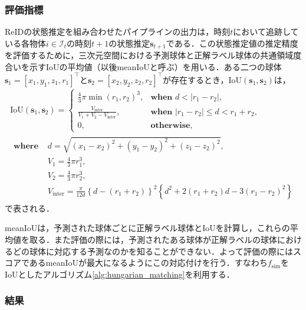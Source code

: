 \subsubsection{評価指標}

ReIDの状態推定を組み合わせたパイプラインの出力は，時刻$t$において追跡している各物体$i \in \mathcal{I}_t$の時刻$t+1$の状態推定$\bm{s}_{t+1}$である．この状態推定値の推定精度を評価するために，三次元空間における予測球体と正解ラベル球体の共通領域度合いを示すIoUの平均値（以後meanIoUと呼ぶ）を用いる．ある二つの球体$\bm{s}_1 = [x_1, y_1, z_1, r_1]^{\top}$と$\bm{s}_2 = [x_2, y_2, z_2, r_2]^{\top}$が存在するとき，IoU$(\bm{s}_1, \bm{s}_2)$は，
\begin{equation}
    \label{eq:sphere_iou}
    \begin{gathered}
        \text{IoU}(\bm{s}_1, \bm{s}_2) = 
        \begin{cases}
            \frac{4}{3} \pi \min(r_1, r_2)^3, & \textbf{when } d < \left|r_1 - r_2\right|,
            \\ \frac{V_{\text{inter}}}{V_1 + V_2 - V_{\text{inter}}} , & \textbf{when } \left|r_1 - r_2\right| \leq d < r_1 + r_2,
            \\ 0, & \textbf{otherwise},
        \end{cases}
        \\
        \begin{aligned}
            \textbf{where } &d = \sqrt{(x_1 - x_2)^2 + (y_1 - y_2)^2 + (z_1 - z_2)^2},
            \\ &V_1 = \frac{4}{3} \pi r_1^3,
            \\ &V_2 = \frac{4}{3} \pi r_2^3,
            \\ &V_{\text{inter}} = \frac{\pi}{12 d} \left\{d - (r_1 + r_2)\right\}^2 \left\{d^2 + 2(r_1 + r_2)d - 3 (r_1 - r_2)^2\right\}
        \end{aligned}
    \end{gathered}
\end{equation}
で表される．

meanIoUは，予測された球体ごとに正解ラベル球体とIoUを計算し，これらの平均値を取る．また評価の際には，予測されたある球体が正解ラベルの球体におけるどの球体に対応する予測なのかを知ることができない．よって評価の際にはスコアであるmeanIoUが最大になるようにこの対応付けを行う．すなわち$f_{\text{sim}}$をIoUとしたアルゴリズム\ref{alg:hungarian_matching}を利用する．

\subsubsection{結果}

